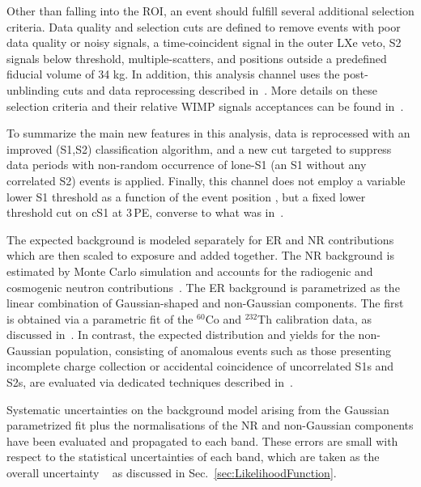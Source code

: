 Other than falling into the ROI, an event should fulfill several additional selection criteria. Data quality and selection cuts are defined to remove events with poor data quality or noisy signals, a time-coincident signal in the outer LXe veto, S2 signals below threshold, multiple-scatters, and positions outside a predefined fiducial volume of 34 kg. In addition, this analysis channel uses the post-unblinding cuts and data reprocessing described in~\cite{xe100_run_combination}. More details on these selection criteria and their relative WIMP signals acceptances can be found in~\cite{Aprile:2012vw,xe100_run_combination}. 


To summarize the main new features in this analysis, data is reprocessed with an improved (S1,S2) classification algorithm, and a new cut targeted to suppress data periods with non-random occurrence of lone-S1 (an S1 without 
any correlated S2) events is applied. 
Finally, this channel does not employ a variable lower S1 threshold as a function of the event position , but a fixed 
lower threshold cut on cS1 at 3\,PE, converse to what was  in~\cite{xe100_run_combination}.

The expected background is modeled separately for ER and NR contributions which are then scaled to exposure and added together.
The NR background is estimated by Monte Carlo simulation and accounts for the radiogenic and cosmogenic neutron
contributions~\cite{Aprile:2013tov}.
The ER background is parametrized as the linear combination of Gaussian-shaped and non-Gaussian components.
The first is obtained via a parametric fit of the $^{60}$Co and $^{232}$Th calibration data, as discussed in~\cite{xe100_run10_si}.
In contrast, the expected distribution and yields for the non-Gaussian population, consisting of anomalous events such as those 
presenting incomplete charge collection or accidental coincidence of uncorrelated S1s and S2s,  
are evaluated via dedicated techniques described in~\cite{xe100_run_combination}.

Systematic uncertainties on the background model arising from the Gaussian parametrized fit plus the normalisations of the NR and non-Gaussian components have been evaluated and propagated to each band. These errors are small with respect to the statistical uncertainties of each band, which are taken as the overall uncertainty ~\cite{xe100_run_combination} as discussed in Sec.~\ref{sec:LikelihoodFunction}.

